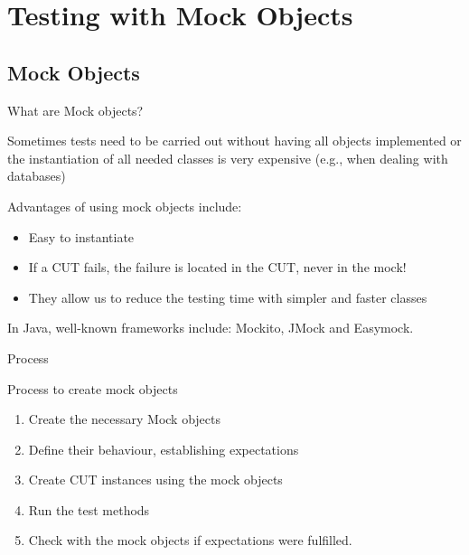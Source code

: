 \documentclass[11pt, xcolor=svgnames]{beamer}
\begin{document}
\section{Testing with Mock Objects}


\subsection{Mock Objects}


\begin{frame}{What are Mock objects?}


Sometimes tests need to be carried out without having all objects implemented or the instantiation of all needed classes is very expensive (e.g., when dealing with databases)

Advantages of using mock objects include:

\begin{itemize}
 \item Easy to instantiate
 \item If a CUT fails, the failure is located in the CUT, never in the mock!
 \item They allow us to reduce the testing time with simpler and faster classes
\end{itemize}

In Java, well-known frameworks include: Mockito, JMock and Easymock.

\end{frame}


\begin{frame}{Process}

Process to create mock objects

\begin{enumerate}
 \item Create the necessary Mock objects
 \item Define their behaviour, establishing expectations
 \item Create CUT instances using the mock objects
 \item Run the test methods 
 \item Check with the mock objects if expectations were fulfilled. 
\end{enumerate}

\end{frame}
\end{document}
